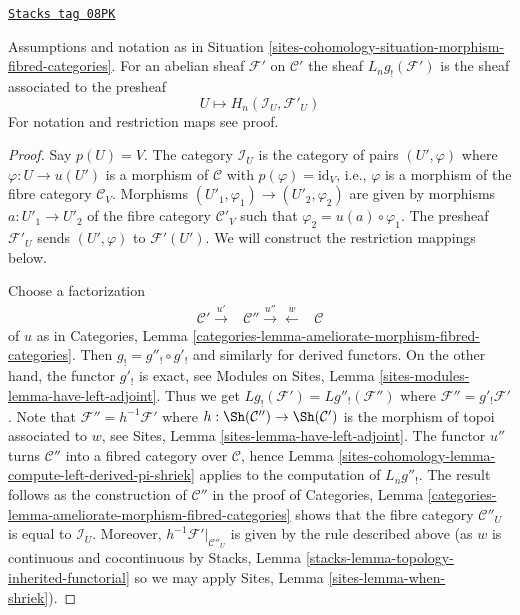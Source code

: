 \begin{lemma}
\label{sites-cohomology-lemma-compute-left-derived-g-shriek}
\href{https://stacks.math.columbia.edu/tag/08PK}{\texttt{Stacks tag 08PK}}

Assumptions and notation as in
Situation \ref{sites-cohomology-situation-morphism-fibred-categories}.
For an abelian sheaf $\mathcal{F}'$ on $\mathcal{C}'$ the sheaf
$L_ng_!(\mathcal{F}')$ is the sheaf associated to the presheaf
$$
U \longmapsto H_n(\mathcal{I}_U, \mathcal{F}'_U)
$$
For notation and restriction maps see proof.
\end{lemma}

\begin{proof}
Say $p(U) = V$. The category $\mathcal{I}_U$ is the category of pairs
$(U', \varphi)$ where $\varphi : U \to u(U')$ is a morphism of $\mathcal{C}$
with $p(\varphi) = \text{id}_V$, i.e., $\varphi$ is a morphism of the
fibre category $\mathcal{C}_V$. Morphisms
$(U'_1, \varphi_1) \to (U'_2, \varphi_2)$ are given by morphisms
$a : U'_1 \to U'_2$ of the fibre category $\mathcal{C}'_V$ such that
$\varphi_2 = u(a) \circ \varphi_1$. The presheaf $\mathcal{F}'_U$ sends
$(U', \varphi)$ to $\mathcal{F}'(U')$.
We will construct the restriction mappings below.

\medskip\noindent
Choose a factorization
$$
\begin{array}{ccc}\mathcal{C}' \overset{u'}{\longrightarrow} & \mathcal{C}'' \overset{u''}{\longrightarrow}\overset{w}{\longleftarrow} & \mathcal{C}\end{array}
$$
of $u$ as in
Categories, Lemma \ref{categories-lemma-ameliorate-morphism-fibred-categories}.
Then $g_! = g''_! \circ g'_!$ and similarly for derived functors.
On the other hand, the functor $g'_!$ is exact, see
Modules on Sites, Lemma \ref{sites-modules-lemma-have-left-adjoint}.
Thus we get $Lg_!(\mathcal{F}') = Lg''_!(\mathcal{F}'')$ where
$\mathcal{F}'' = g'_!\mathcal{F}'$. Note that
$\mathcal{F}'' = h^{-1}\mathcal{F}'$ where
$h : \Sh(\mathcal{C}'') \to \Sh(\mathcal{C}')$ is the morphism of topoi
associated to $w$, see
Sites, Lemma \ref{sites-lemma-have-left-adjoint}.
The functor $u''$ turns $\mathcal{C}''$ into a fibred category
over $\mathcal{C}$, hence
Lemma \ref{sites-cohomology-lemma-compute-left-derived-pi-shriek}
applies to the computation of $L_ng''_!$. The result follows as the
construction of $\mathcal{C}''$ in the proof of
Categories, Lemma \ref{categories-lemma-ameliorate-morphism-fibred-categories}
shows that the fibre category $\mathcal{C}''_U$ is equal to
$\mathcal{I}_U$. Moreover, $h^{-1}\mathcal{F}'|_{\mathcal{C}''_U}$
is given by the rule described above
(as $w$ is continuous and cocontinuous by
Stacks, Lemma \ref{stacks-lemma-topology-inherited-functorial}
so we may apply
Sites, Lemma \ref{sites-lemma-when-shriek}).
\end{proof}

